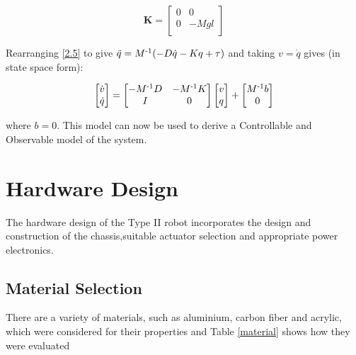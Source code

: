 \documentclass{UoNMCHA}
\numberwithin{equation}{section}
\begin{document}
\begin{equation}
\mathbf{K} = 
\begin{bmatrix}
0 & 0\\
0 & -Mgl \\
\end{bmatrix}
\end{equation}

Rearranging \ref{2.5} to give $\ddot{q} = M\textsuperscript{-1}(-D\dot{q} - Kq + \tau)$ and taking $v=\dot{q}$ gives (in state space form):

\begin{equation}
\begin{bmatrix}
\dot{v} \\
\dot{q} \\
\end{bmatrix} = 
\begin{bmatrix}
-M\textsuperscript{-1}D & -M\textsuperscript{-1}K\\
I & 0 \\
\end{bmatrix}
\begin{bmatrix}
v\\
q\\
\end{bmatrix}
+
\begin{bmatrix}
M\textsuperscript{-1}b\\
0\\
\end{bmatrix}
\end{equation}

where $b = 0$. 
This model can now be used to derive a Controllable and Observable model of the system.

\newpage
\section{Hardware Design}\label{Hardware}

The hardware design of the Type II robot incorporates the design and construction of the chassis,suitable actuator selection and appropriate power electronics.

\subsection{Material Selection}

There are a variety of materials, such as aluminium, carbon fiber and acrylic, which were considered for their properties and Table \ref{material} shows how they were evaluated
\end{document}
